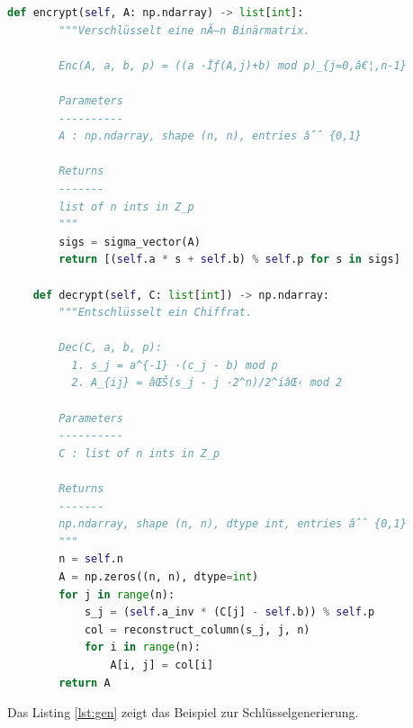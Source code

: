 ﻿\documentclass[a4paper,12pt]{scrreprt}
\theoremstyle{definition}
\begin{document}
\begin{lstlisting}[language=Python, caption=Signatur-Chiffre: Kernklasse, label=lst:chiffre]
    def encrypt(self, A: np.ndarray) -> list[int]:
        """Verschlüsselt eine nÃ—n Binärmatrix.

        Enc(A, a, b, p) = ((a ·Ïƒ(A,j)+b) mod p)_{j=0,â€¦,n-1}

        Parameters
        ----------
        A : np.ndarray, shape (n, n), entries âˆˆ {0,1}

        Returns
        -------
        list of n ints in Z_p
        """
        sigs = sigma_vector(A)
        return [(self.a * s + self.b) % self.p for s in sigs]

    def decrypt(self, C: list[int]) -> np.ndarray:
        """Entschlüsselt ein Chiffrat.

        Dec(C, a, b, p):
          1. s_j = a^{-1} ·(c_j - b) mod p
          2. A_{ij} = âŒŠ(s_j - j ·2^n)/2^iâŒ‹ mod 2

        Parameters
        ----------
        C : list of n ints in Z_p

        Returns
        -------
        np.ndarray, shape (n, n), dtype int, entries âˆˆ {0,1}
        """
        n = self.n
        A = np.zeros((n, n), dtype=int)
        for j in range(n):
            s_j = (self.a_inv * (C[j] - self.b)) % self.p
            col = reconstruct_column(s_j, j, n)
            for i in range(n):
                A[i, j] = col[i]
        return A
\end{lstlisting}

Das Listing \ref{lst:gen} zeigt das Beispiel zur Schlüsselgenerierung.
\end{document}
